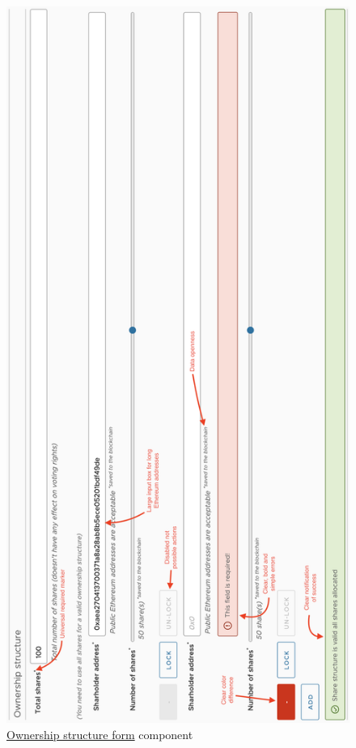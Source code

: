 \begin{figure}[H]
\caption{\href{https://github.com/MrHarrisonBarker/CRPL/tree/main/CRPL.Web/ClientApp/src/app/Forms/ownership-structure-form}{Ownership structure form} component}
\centering
\includegraphics[width=\textwidth,height=\textheight,keepaspectratio]{images/wireframe/ownership-structure}
\end{figure}